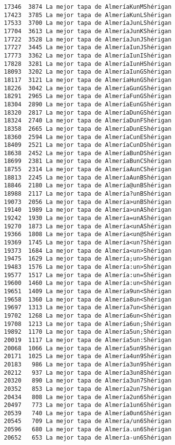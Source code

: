 \documentclass[11pt]{article}
\begin{document}
\begin{Verbatim}[commandchars=\\\{\}]
17346  3874 La mejor tapa de AlmeríaKunMShérigan
17423  3785 La mejor tapa de AlmeríaKunLShérigan
17533  3700 La mejor tapa de AlmeríaJunLShérigan
17704  3613 La mejor tapa de AlmeríaJunKShérigan
17722  3528 La mejor tapa de AlmeríaJunJShérigan
17727  3445 La mejor tapa de AlmeríaIunJShérigan
17773  3362 La mejor tapa de AlmeríaIunIShérigan
17828  3281 La mejor tapa de AlmeríaIunHShérigan
18093  3202 La mejor tapa de AlmeríaIunGShérigan
18117  3121 La mejor tapa de AlmeríaHunGShérigan
18226  3042 La mejor tapa de AlmeríaGunGShérigan
18291  2965 La mejor tapa de AlmeríaFunGShérigan
18304  2890 La mejor tapa de AlmeríaEunGShérigan
18320  2817 La mejor tapa de AlmeríaDunGShérigan
18324  2740 La mejor tapa de AlmeríaDunFShérigan
18358  2665 La mejor tapa de AlmeríaDunEShérigan
18360  2594 La mejor tapa de AlmeríaCunEShérigan
18409  2521 La mejor tapa de AlmeríaCunDShérigan
18638  2452 La mejor tapa de AlmeríaBunDShérigan
18699  2381 La mejor tapa de AlmeríaBunCShérigan
18755  2314 La mejor tapa de AlmeríaAunCShérigan
18813  2245 La mejor tapa de AlmeríaAunBShérigan
18846  2180 La mejor tapa de Almería@unBShérigan
18988  2117 La mejor tapa de Almería?unBShérigan
19073  2056 La mejor tapa de Almería>unBShérigan
19140  1989 La mejor tapa de Almería>unAShérigan
19242  1930 La mejor tapa de Almería=unAShérigan
19270  1873 La mejor tapa de Almería<unAShérigan
19366  1808 La mejor tapa de Almería<un@Shérigan
19369  1745 La mejor tapa de Almería<un?Shérigan
19373  1684 La mejor tapa de Almería<un>Shérigan
19475  1629 La mejor tapa de Almería;un>Shérigan
19483  1576 La mejor tapa de Almería:un>Shérigan
19577  1517 La mejor tapa de Almería:un=Shérigan
19600  1460 La mejor tapa de Almería:un<Shérigan
19651  1409 La mejor tapa de Almería9un<Shérigan
19658  1360 La mejor tapa de Almería8un<Shérigan
19697  1313 La mejor tapa de Almería7un<Shérigan
19702  1268 La mejor tapa de Almería6un<Shérigan
19708  1213 La mejor tapa de Almería6un;Shérigan
19892  1170 La mejor tapa de Almería5un;Shérigan
20019  1117 La mejor tapa de Almería5un:Shérigan
20068  1066 La mejor tapa de Almería5un9Shérigan
20171  1025 La mejor tapa de Almería4un9Shérigan
20183   986 La mejor tapa de Almería3un9Shérigan
20212   937 La mejor tapa de Almería3un8Shérigan
20320   890 La mejor tapa de Almería3un7Shérigan
20352   853 La mejor tapa de Almería2un7Shérigan
20434   808 La mejor tapa de Almería2un6Shérigan
20497   773 La mejor tapa de Almería1un6Shérigan
20539   740 La mejor tapa de Almería0un6Shérigan
20545   709 La mejor tapa de Almería/un6Shérigan
20596   680 La mejor tapa de Almería.un6Shérigan
20652   653 La mejor tapa de Almería-un6Shérigan

\end{Verbatim}
\end{document}
